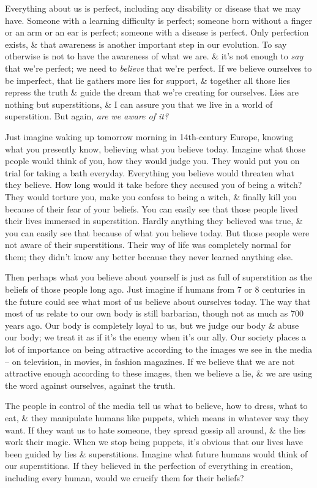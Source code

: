 \documentclass{article}
\numberwithin{equation}{section}
\begin{document}
Everything about us is perfect, including any disability or disease that we may have. Someone with a learning difficulty is perfect; someone born without a finger or an arm or an ear is perfect; someone with a disease is perfect. Only perfection exists, \& that awareness is another important step in our evolution. To say otherwise is not to have the awareness of what we are. \& it's not enough to \textit{say} that we're perfect; we need to \textit{believe} that we're perfect. If we believe ourselves to be imperfect, that lie gathers more lies for support, \& together all those lies repress the truth \& guide the dream that we're creating for ourselves. Lies are nothing but superstitions, \& I can assure you that we live in a world of superstition. But again, \textit{are we aware of it?}

Just imagine waking up tomorrow morning in 14th-century Europe, knowing what you presently know, believing what you believe today. Imagine what those people would think of you, how they would judge you. They would put you on trial for taking a bath everyday. Everything you believe would threaten what they believe. How long would it take before they accused you of being a witch? They would torture you, make you confess to being a witch, \& finally kill you because of their fear of your beliefs. You can easily see that those people lived their lives immersed in superstition. Hardly anything they believed was true, \& you can easily see that because of what you believe today. But those people were not aware of their superstitions. Their way of life was completely normal for them; they didn't know any better because they never learned anything else.

Then perhaps what you believe about yourself is just as full of superstition as the beliefs of those people long ago. Just imagine if humans from 7 or 8 centuries in the future could see what most of us believe about ourselves today. The way that most of us relate to our own body is still barbarian, though not as much as 700 years ago. Our body is completely loyal to us, but we judge our body \& abuse our body; we treat it as if it's the enemy when it's our ally. Our society places a lot of importance on being attractive according to the images we see in the media -- on television, in movies, in fashion magazines. If we believe that we are not attractive enough according to these images, then we believe a lie, \& we are using the word against ourselves, against the truth.

The people in control of the media tell us what to believe, how to dress, what to eat, \& they manipulate humans like puppets, which means in whatever way they want. If they want us to hate someone, they spread gossip all around, \& the lies work their magic. When we stop being puppets, it's obvious that our lives have been guided by lies \& superstitions. Imagine what future humans would think of our superstitions. If they believed in the perfection of everything in creation, including every human, would we crucify them for their beliefs?
\end{document}
